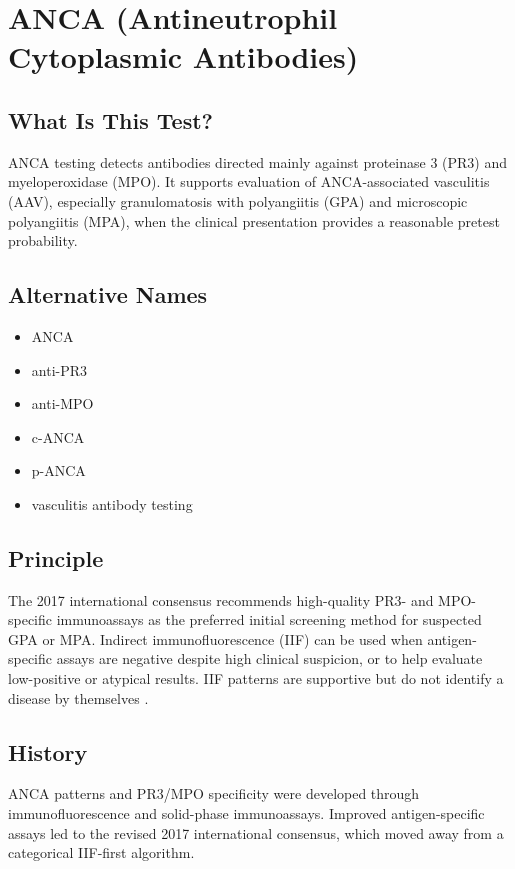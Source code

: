 \chapter{ANCA (Antineutrophil Cytoplasmic Antibodies)}

\section*{What Is This Test?}
ANCA testing detects antibodies directed mainly against proteinase 3 (PR3) and myeloperoxidase (MPO). It supports evaluation of ANCA-associated vasculitis (AAV), especially granulomatosis with polyangiitis (GPA) and microscopic polyangiitis (MPA), when the clinical presentation provides a reasonable pretest probability.

\section*{Alternative Names}
\begin{itemize}
  \item ANCA
  \item anti-PR3
  \item anti-MPO
  \item c-ANCA
  \item p-ANCA
  \item vasculitis antibody testing
\end{itemize}
\section*{Principle}
The 2017 international consensus recommends high-quality PR3- and MPO-specific immunoassays as the preferred initial screening method for suspected GPA or MPA. Indirect immunofluorescence (IIF) can be used when antigen-specific assays are negative despite high clinical suspicion, or to help evaluate low-positive or atypical results. IIF patterns are supportive but do not identify a disease by themselves \cite{bossuyt2017revised}.

\section*{History}
ANCA patterns and PR3/MPO specificity were developed through immunofluorescence and solid-phase immunoassays. Improved antigen-specific assays led to the revised 2017 international consensus, which moved away from a categorical IIF-first algorithm.

